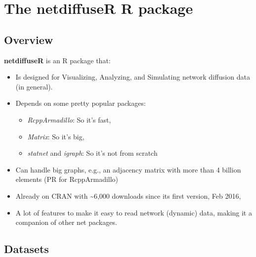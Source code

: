 \documentclass[]{book}
\providecommand{\tightlist}{%
  \setlength{\itemsep}{0pt}\setlength{\parskip}{0pt}}
\begin{document}
\hypertarget{the-netdiffuser-r-package}{%
\section{The netdiffuseR R package}\label{the-netdiffuser-r-package}}

\hypertarget{overview}{%
\subsection{Overview}\label{overview}}

\textbf{netdiffuseR} is an R package that:

\begin{itemize}
\item
  Is designed for Visualizing, Analyzing, and Simulating network diffusion data (in general).
\item
  Depends on some pretty popular packages:

  \begin{itemize}
  \tightlist
  \item
    \emph{RcppArmadillo}: So it's fast,
  \item
    \emph{Matrix}: So it's big,
  \item
    \emph{statnet} and \emph{igraph}: So it's not from scratch
  \end{itemize}
\item
  Can handle big graphs, e.g., an adjacency matrix with more than 4 billion elements (PR for RcppArmadillo)
\item
  Already on CRAN with \textasciitilde{}6,000 downloads since its first version, Feb 2016,
\item
  A lot of features to make it easy to read network (dynamic) data, making it a companion of other net packages.
\end{itemize}

\hypertarget{datasets}{%
\subsection{Datasets}\label{datasets}}
\end{document}
